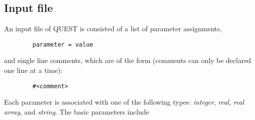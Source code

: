 \documentclass[12pt]{article}
\begin{document}
    \subsection{Input file}\label{sec config}
        An input file of QUEST is consisted of a list of parameter assignments,
        \begin{verbatim}
        parameter = value
        \end{verbatim}
        and single line comments, which are of the form (comments can only be declared one line at a time):
        \begin{verbatim}
        #<comment>
        \end{verbatim}
        Each parameter is associated with one of the following types: \emph{integer}, \emph{real}, \emph{real array}, and \emph{string}.
        The basic parameters include
\end{document}
